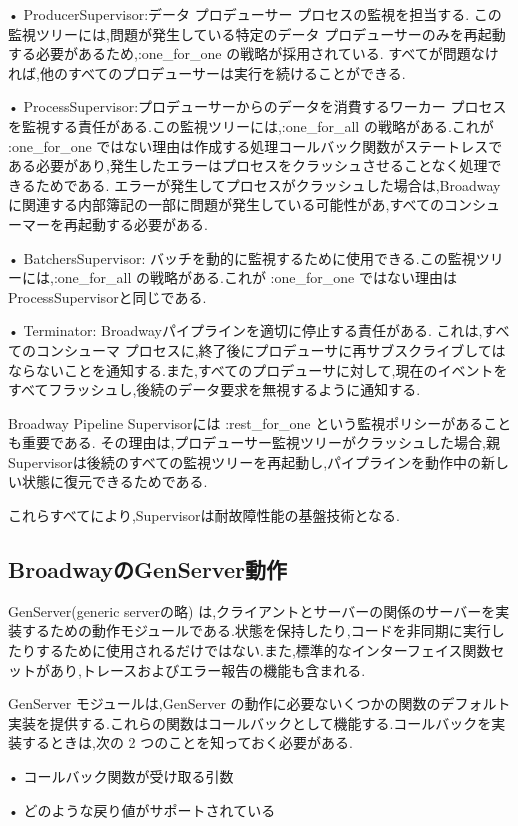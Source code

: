 \documentclass[a4paper]{jreport}	%
\begin{document}
• ProducerSupervisor:データ プロデューサー プロセスの監視を担当する. この監視ツリーには,問題が発生している特定のデータ プロデューサーのみを再起動する必要があるため,:one\_for\_one の戦略が採用されている. すべてが問題なければ,他のすべてのプロデューサーは実行を続けることができる.

• ProcessSupervisor:プロデューサーからのデータを消費するワーカー プロセスを監視する責任がある.この監視ツリーには,:one\_for\_all の戦略がある.これが :one\_for\_one ではない理由は作成する処理コールバック関数がステートレスである必要があり,発生したエラーはプロセスをクラッシュさせることなく処理できるためである. エラーが発生してプロセスがクラッシュした場合は,Broadwayに関連する内部簿記の一部に問題が発生している可能性があ,すべてのコンシューマーを再起動する必要がある.

• BatchersSupervisor: バッチを動的に監視するために使用できる.この監視ツリーには,:one\_for\_all の戦略がある.これが :one\_for\_one ではない理由はProcessSupervisorと同じである.

• Terminator: Broadwayパイプラインを適切に停止する責任がある. これは,すべてのコンシューマ プロセスに,終了後にプロデューサに再サブスクライブしてはならないことを通知する.また,すべてのプロデューサに対して,現在のイベントをすべてフラッシュし,後続のデータ要求を無視するように通知する.

Broadway Pipeline Supervisorには :rest\_for\_one という監視ポリシーがあることも重要である. その理由は,プロデューサー監視ツリーがクラッシュした場合,親Supervisorは後続のすべての監視ツリーを再起動し,パイプラインを動作中の新しい状態に復元できるためである.


これらすべてにより,Supervisorは耐故障性能の基盤技術となる.

\subsection{BroadwayのGenServer動作}
GenServer(generic serverの略) は,クライアントとサーバーの関係のサーバーを実装するための動作モジュールである.状態を保持したり,コードを非同期に実行したりするために使用されるだけではない.また,標準的なインターフェイス関数セットがあり,トレースおよびエラー報告の機能も含まれる\cite{M}.

GenServer モジュールは,GenServer の動作に必要ないくつかの関数のデフォルト実装を提供する.これらの関数はコールバックとして機能する.コールバックを実装するときは,次の 2 つのことを知っておく必要がある.

• コールバック関数が受け取る引数

• どのような戻り値がサポートされている
\end{document}

